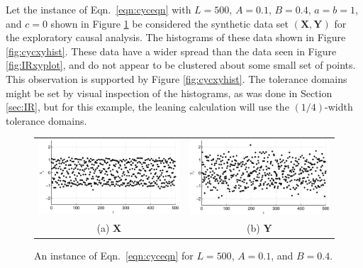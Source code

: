 \documentclass{article}[10pt]
\begin{document}
Let the instance of Eqn.\ \ref{eqn:cyceqn} with $L=500$, $A=0.1$, $B=0.4$, $a=b=1$, and $c=0$ shown in Figure \ref{fig:cycxyplot} be considered the synthetic data set $(\mathbf{X},\mathbf{Y})$ for the exploratory causal analysis.  The histograms of these data shown in Figure \ref{fig:cycxyhist}.  These data have a wider spread than the data seen in Figure \ref{fig:IRxyplot}, and do not appear to be clustered about some small set of points.  This observation is supported by Figure \ref{fig:cycxyhist}.  The tolerance domains might be set by visual inspection of the histograms, as was done in Section \ref{sec:IR}, but for this example, the leaning calculation will use the $(1/4)$-width tolerance domains.
\begin{figure}[ht]
\begin{tabular}{cc}
\includegraphics[scale=0.5]{NoisyCyclicResponseExample_X.eps} & \includegraphics[scale=0.5]{NoisyCyclicResponseExample_Y.eps} \\
(a) $\mathbf{X}$ & (b) $\mathbf{Y}$
\end{tabular}
\caption{An instance of Eqn.\ \ref{eqn:cyceqn} for $L=500$, $A=0.1$, and $B=0.4$.}
\label{fig:cycxyplot}
\end{figure}
\end{document}

